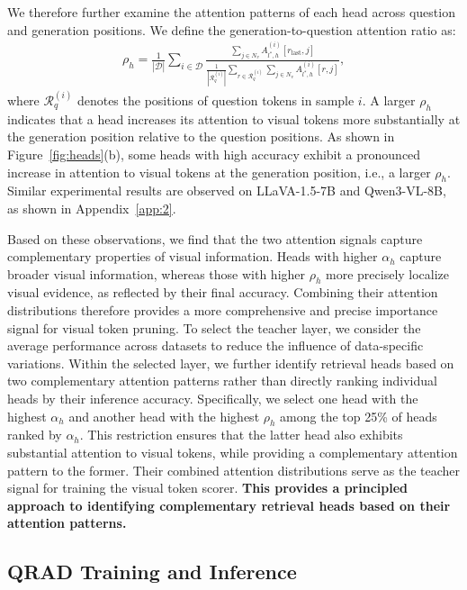 We therefore further examine the attention patterns of each head across question and generation positions. We define the generation-to-question attention ratio as:
\begin{align}
\rho_h = \frac{1}{|\mathcal{D}|}
\sum_{i\in\mathcal{D}}
\frac{
\sum\limits_{j\in N_v} A_{l^*,h}^{(i)}[r_{\mathrm{last}},j]
}{
\frac{1}{|\mathcal{R}_q^{(i)}|}
\sum\limits_{r\in\mathcal{R}_q^{(i)}}
\sum\limits_{j\in N_v} A_{l^*,h}^{(i)}[r,j]
},
\end{align}
where $\mathcal{R}_q^{(i)}$ denotes the positions of question tokens in sample $i$. A larger $\rho_h$ indicates that a head increases its attention to visual tokens more substantially at the generation position relative to the question positions.
As shown in Figure~\ref{fig:heads}(b), some heads with high accuracy exhibit a pronounced increase in attention to visual tokens at the generation position, i.e., a larger $\rho_h$. Similar experimental results are observed on LLaVA-1.5-7B and Qwen3-VL-8B, as shown in Appendix~\ref{app:2}.

Based on these observations, we find that the two attention signals capture complementary properties of visual information. Heads with higher $\alpha_h$ capture broader visual information, whereas those with higher $\rho_h$ more precisely localize visual evidence, as reflected by their final accuracy. Combining their attention distributions therefore provides a more comprehensive and precise importance signal for visual token pruning. 
To select the teacher layer, we consider the average performance across datasets to reduce the influence of data-specific variations. Within the selected layer, we further identify retrieval heads based on two complementary attention patterns rather than directly ranking individual heads by their inference accuracy. Specifically, we select one head with the highest $\alpha_h$ and another head with the highest $\rho_h$ among the top 25\% of heads ranked by $\alpha_h$. This restriction ensures that the latter head also exhibits substantial attention to visual tokens, while providing a complementary attention pattern to the former. Their combined attention distributions serve as the teacher signal for training the visual token scorer. \textbf{This provides a principled approach to identifying complementary retrieval heads based on their attention patterns.}
\subsection{QRAD Training and Inference}
\label{sec:qrad}

